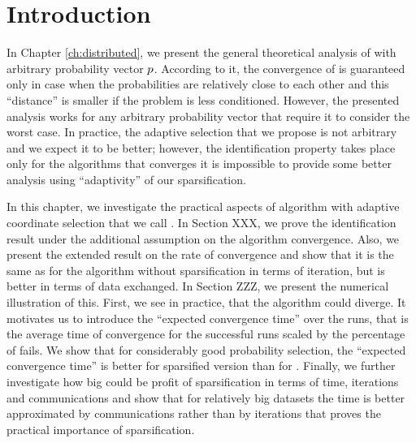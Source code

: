 \section{Introduction}\label{sec:soda-intro}
In Chapter \ref{ch:distributed}, we present the general theoretical analysis of \salgo with arbitrary probability vector ${p}$. According to it, the convergence of \salgo is guaranteed only in case when the probabilities are relatively close to each other and this ``distance'' is smaller if the problem is less conditioned. However, the presented analysis works for any arbitrary probability vector that require it to consider the worst case. In practice, the adaptive selection that we propose is not arbitrary and we expect it to be better; however, the identification property takes place only for the algorithms that converges it is impossible to provide some better analysis using ``adaptivity'' of our sparsification.

In this chapter, we investigate the practical aspects of \salgo algorithm with adaptive coordinate selection that we call \SP. In Section XXX, we prove the identification result under the additional assumption on the algorithm convergence. Also, we present the extended result on the rate of convergence and show that it is the same as for the algorithm without sparsification in terms of iteration, but is better in terms of data exchanged. In Section ZZZ, we present the numerical illustration of this. First, we see in practice, that the algorithm could diverge. It motivates us to introduce the ``expected convergence time'' over the runs, that is the average time of convergence for the successful runs scaled by the percentage of fails. We show that for considerably good probability selection, the ``expected convergence time'' is better for sparsified version than for \dave. Finally, we further investigate how big could be profit of sparsification in terms of time, iterations and communications and show that for relatively big datasets the time is better approximated by communications rather than by iterations that proves the practical importance of sparsification.